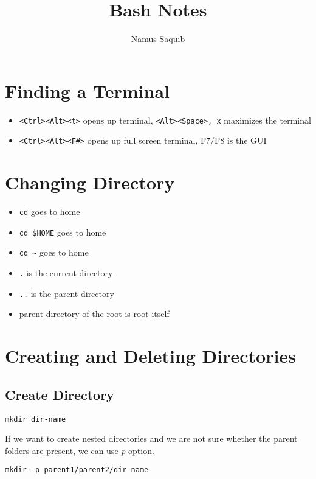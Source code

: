 \documentclass[a4paper, 12pt]{article}
\begin{document}
\title{Bash Notes}
\author{Namus Saquib}

\maketitle
\tableofcontents

\section{Finding a Terminal}
\begin{itemize}
	\item \verb|<Ctrl><Alt><t>| opens up terminal, \verb|<Alt><Space>, x| maximizes the terminal
	\item \verb|<Ctrl><Alt><F#>| opens up full screen terminal, F7/F8 is the GUI
\end{itemize}

\section{Changing Directory}
\begin{itemize}
	\item \verb|cd| goes to home
	\item \verb|cd $HOME| goes to home
	\item \verb|cd ~| goes to home
	\item \verb|.| is the current directory
	\item \verb|..| is the parent directory
	\item parent directory of the root is root itself
\end{itemize}

\section{Creating and Deleting Directories}
\subsection{Create Directory}
\begin{verbatim}
mkdir dir-name
\end{verbatim}
If we want to create nested directories and we are not sure whether the parent folders are present, we can use \emph{p} option.
\begin{verbatim}
mkdir -p parent1/parent2/dir-name
\end{verbatim}
\end{document}
